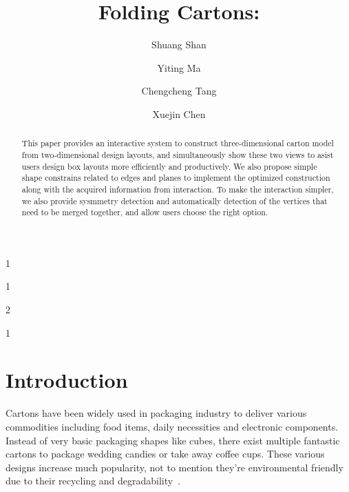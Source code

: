 \documentclass[submission]{gmp2018}
\begin{document}
%
%
\title{Folding Cartons: }

%
%
\SubNumber{{\color{red}{XXX}}}

%
%
\author{Shuang Shan}{1}
\author{Yiting Ma}{1}
\author{Chengcheng Tang}{2}
\author{Xuejin Chen}{1}

%
%

%
%


\maketitle

\begin{abstract}
This paper provides an interactive system to construct three-dimensional carton model from two-dimensional design layouts, and simultaneously show these two views to asist users design box layouts more efficiently and productively. We also propose simple shape constrains related to edges and planes to implement the optimized construction along with the acquired information from interaction. To make the interaction simpler, we also provide sysmmetry detection and automatically detection of the vertices that need to be merged together, and allow users choose the right option.  
\end{abstract}


\section{Introduction}
Cartons have been widely used in packaging industry to deliver various commodities including food items, daily necessities and electronic components. Instead of very basic packaging shapes like cubes, there exist multiple fantastic cartons to package wedding candies or take away coffee cups. These various designs increase much popularity, not to mention they're environmental friendly due to their recycling and degradability~\cite{Mullineux:2010:CSC:1739328.1739673}.
\end{document}
